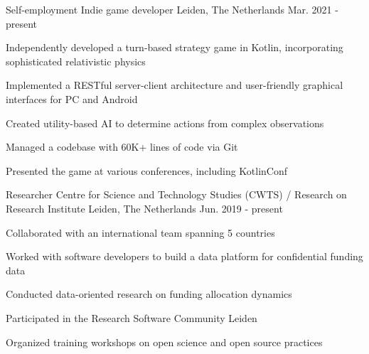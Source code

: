

\begin{cventries}

  \cventry
    {Self-employment} %
    {Indie game developer} %
    {Leiden, The Netherlands} %
    {Mar. 2021 - present} %
    {
      \begin{cvitems} %
        \item{Independently developed a turn-based strategy game in Kotlin, incorporating sophisticated relativistic physics}
        \item{Implemented a RESTful server-client architecture and user-friendly graphical interfaces for PC and Android}
        \item{Created utility-based AI to determine actions from complex observations}
        \item{Managed a codebase with 60K+ lines of code via Git}
        \item{Presented the game at various conferences, including KotlinConf}
      \end{cvitems}
    }

  \cventry
    {Researcher} %
    {Centre for Science and Technology Studies (CWTS) / Research on Research Institute} %
    {Leiden, The Netherlands} %
    {Jun. 2019 - present} %
    {
      \begin{cvitems} %
        \item{Collaborated with an international team spanning 5 countries}
        \item{Worked with software developers to build a data platform for confidential funding data}
        \item{Conducted data-oriented research on funding allocation dynamics}
        \item{Participated in the Research Software Community Leiden}
        \item{Organized training workshops on open science and open source practices}
      \end{cvitems}
    }


\end{cventries}
